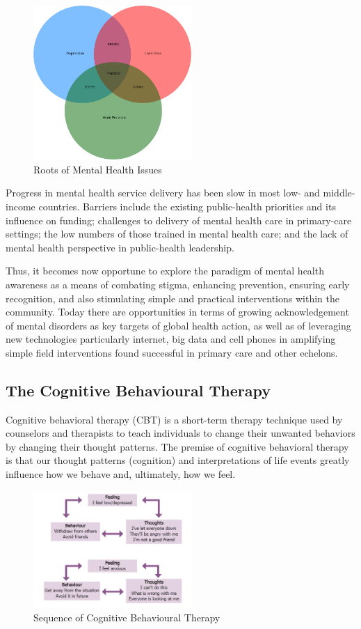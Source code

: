 \documentclass[conference,compsoc]{IEEEtran}
\begin{document}
\begin{figure}[H]
    \centering
    \includegraphics[width=6cm]{images/roots-mental-health-issues.png}
    \caption{Roots of Mental Health Issues}
    \label{fig:roots-mental-health-issues}
\end{figure}

Progress in mental health service delivery has been slow in most low- and middle-income countries. Barriers include the existing public-health priorities and its influence on funding; challenges to delivery of mental health care in primary-care settings; the low numbers of those trained in mental health care; and the lack of mental health perspective in public-health leadership.

Thus, it becomes now opportune to explore the paradigm of mental health awareness as a means of combating stigma, enhancing prevention, ensuring early recognition, and also stimulating simple and practical interventions within the community. Today there are opportunities in terms of growing acknowledgement of mental disorders as key targets of global health action, as well as of leveraging new technologies particularly internet, big data and cell phones in amplifying simple field interventions found successful in primary care and other echelons.

\subsection{The Cognitive Behavioural Therapy}

Cognitive behavioral therapy (CBT) is a short-term therapy technique used by counselors and therapists to teach individuals to change their unwanted behaviors by changing their thought patterns. The premise of cognitive behavioral therapy is that our thought patterns (cognition) and interpretations of life events greatly influence how we behave and, ultimately, how we feel.

\begin{figure}[H]
    \centering
    \includegraphics[width=6cm]{images/cbt-diagram.jpg}
    \caption{Sequence of Cognitive Behavioural Therapy}
    \label{fig:cbt-diagram}
\end{figure}
\end{document}

